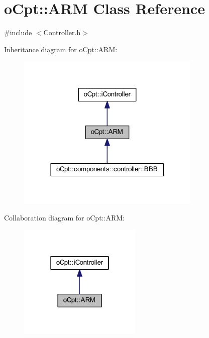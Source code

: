 \hypertarget{classo_cpt_1_1_a_r_m}{}\section{o\+Cpt\+:\+:A\+RM Class Reference}
\label{classo_cpt_1_1_a_r_m}


{\ttfamily \#include $<$Controller.\+h$>$}



Inheritance diagram for o\+Cpt\+:\+:A\+RM\+:\nopagebreak
\begin{figure}[H]
\begin{center}
\leavevmode
\includegraphics[width=248pt]{classo_cpt_1_1_a_r_m__inherit__graph}
\end{center}
\end{figure}


Collaboration diagram for o\+Cpt\+:\+:A\+RM\+:\nopagebreak
\begin{figure}[H]
\begin{center}
\leavevmode
\includegraphics[width=166pt]{classo_cpt_1_1_a_r_m__coll__graph}
\end{center}
\end{figure}
